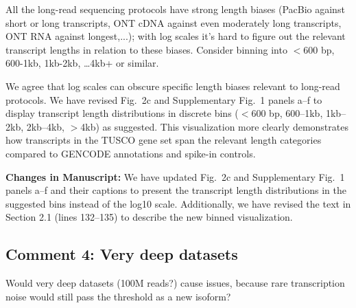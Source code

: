 \documentclass[11pt]{article}
\begin{document}
\begin{reviewercomment}
All the long-read sequencing protocols have strong length biases (PacBio against short or long transcripts, ONT cDNA against even moderately long transcripts, ONT RNA against longest,...); with log scales it's hard to figure out the relevant transcript lengths in relation to these biases. Consider binning into $<$600 bp, 600-1kb, 1kb-2kb, \ldots 4kb+ or similar.
\end{reviewercomment}

\begin{responseboxnew}
We agree that log scales can obscure specific length biases relevant to long-read protocols. We have revised Fig.~2c and Supplementary Fig.~1 panels a--f to display transcript length distributions in discrete bins ($<$600 bp, 600--1kb, 1kb--2kb, 2kb--4kb, $>$4kb) as suggested. This visualization more clearly demonstrates how transcripts in the TUSCO gene set span the relevant length categories compared to GENCODE annotations and spike-in controls.

\vspace{0.3cm}
\textbf{Changes in Manuscript:} We have updated Fig.~2c and Supplementary Fig.~1 panels a--f and their captions to present the transcript length distributions in the suggested bins instead of the log10 scale. Additionally, we have revised the text in Section 2.1 (lines 132--135) to describe the new binned visualization.
\end{responseboxnew}

\subsection{Comment 4: Very deep datasets}

\begin{reviewercomment}
Would very deep datasets (100M reads?) cause issues, because rare transcription noise would still pass the threshold as a new isoform?
\end{reviewercomment}
\end{document}
